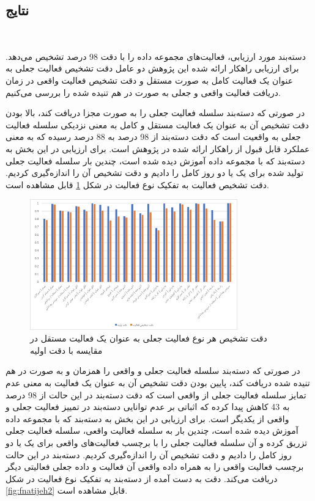 \subsection{نتایج}‌

دسته‌بند مورد ارزیابی، فعالیت‌های مجموعه داده  را با دقت 98 درصد تشخیص می‌دهد. برای ارزیابی راهکار ارائه شده این پژوهش دو عامل دقت تشخیص فعالیت جعلی به عنوان یک فعالیت کامل به صورت مستقل و دقت تشخیص فعالیت واقعی در زمان دریافت فعالیت واقعی و جعلی به صورت در هم تنیده شده را بررسی می‌کنیم.

 در صورتی که دسته‌بند سلسله فعالیت جعلی را به صورت مجزا دریافت کند، بالا بودن دقت تشخیص آن به عنوان یک فعالیت مستقل و کامل به معنی نزدیکی سلسله فعالیت جعلی به واقعیت است که دقت دسته‌بند از 98 درصد به 88 درصد رسیده که به معنی عملکرد قابل قبول از راهکار ارائه شده در پژوهش است. برای ارزیابی در این بخش به دسته‌بند که با مجموعه داده  آموزش دیده شده است، چندین بار سلسله فعالیت جعلی تولید شده برای یک یا دو روز کامل را دادیم و دقت تشخیص آن را اندازه‌گیری کردیم. دقت تشخیص فعالیت به تفکیک نوع فعالیت در شکل \ref{fig:fnatijeh1} قابل مشاهده است.

\begin{figure}[H]
\centerline{\includegraphics[width=0.8\textwidth]{figs/fnatijeh1.png}}
\caption{دقت تشخیص هر نوع فعالیت جعلی به عنوان یک فعالیت مستقل در مقایسه با دقت اولیه}
\label{fig:fnatijeh1}
\end{figure}

در صورتی که دسته‌بند سلسله فعالیت جعلی و واقعی را همزمان و به صورت در هم تنیده شده دریافت کند، پایین بودن دقت تشخیص آن به عنوان یک فعالیت به معنی عدم تمایز سلسله فعالیت جعلی از واقعی است که دقت دسته‌بند در این حالت از 98 درصد به 43 کاهش پیدا کرده که اثباتی بر عدم توانایی دسته‌بند در تمییز فعالیت جعلی و واقعی از یکدیگر است. برای ارزیابی در این بخش به دسته‌بند که با مجموعه داده  آموزش دیده شده است، چندین بار به سلسله فعالیت واقعی، سلسله فعالیت جعلی تزریق کرده و آن سلسله فعالیت جعلی را با برچسب فعالیت‌های واقعی برای یک یا دو روز کامل را دادیم و دقت تشخیص آن را اندازه‌گیری کردیم. دسته‌بند در این حالت برچسب فعالیت واقعی را به همراه داده واقعی آن فعالیت و داده جعلی فعالیتی دیگر دریافت می‌کند. دقت به دست آمده از دسته‌بند به تفکیک نوع فعالیت در شکل \ref{fig:fnatijeh2} قابل مشاهده است.

